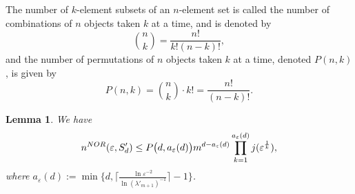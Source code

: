 \documentclass[10pt,a4paper]{amsart}
\newtheorem{lem}[thm]{Lemma}
\numberwithin{equation}{section}
\def\vz{\varepsilon}
\begin{document}
The number of $k$-element subsets of an $n$-element set is called the number of combinations of $n$ objects taken
$k$ at a time, and is denoted by
$$\binom{n}{k}=\frac{n!}{k!(n-k)!},$$
and the number of permutations of $n$ objects taken $k$ at a time, denoted $P(n,k)$, is given by
 $$P(n,k)=\binom{n}{k}\cdot k!=\frac{n!}{(n-k)!}.$$



\begin{lem}\label{lem2}
We have
\begin{equation}\label{2.3}
n^{\rm NOR}(\vz,S_d')\le
P\big(d,{a_{\vz}(d)}\big)m^{d-a_{\vz}(d)}\prod_{k=1}^{a_{\vz}(d)}j(\vz^{\frac{1}{k}}),
\end{equation}
where  $a_{\vz}(d):=\min\big\{d,
\big\lceil\frac{\ln\vz^{-2}}{\ln(\lambda'_{m+1})^{-1}}\big\rceil-1\big\}$.
\end{lem}
\end{document}
